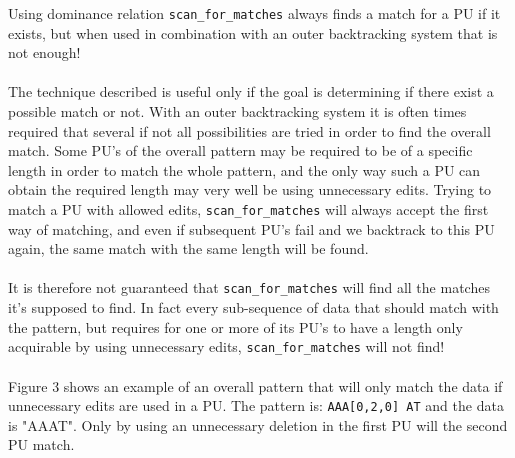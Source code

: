\documentclass[12pt]{article}
\newcommand{\scm}{\texttt{scan\_for\_matches} }
\newcommand{\pu}{PU }
\newcommand{\pus}{PU's }
\newcommand{\pup}{PU. }
\begin{document}
%
\noindent Using dominance relation \scm always finds a match for a \pu if it exists, but when used in combination
with an outer backtracking system that is not enough! \\ \\
The technique described is useful only if the goal is determining if there exist a possible match or not.
With an outer backtracking system it is often times required that several if not all possibilities are tried in
order to find the overall match. Some \pus of the overall pattern may be required to be of a specific length in order to
match the whole pattern, and the only way such a \pu can obtain the required length may very well be using unnecessary
edits. Trying to match a \pu with allowed edits, \scm will always accept the first way of matching, and even if
subsequent \pus fail and we backtrack to this \pu again, the same match with the same length will be found. \\ \\
It is therefore not guaranteed that \scm will find all the matches it's supposed to find. In fact every sub-sequence
of data that should match with the pattern, but requires for one or more of its \pus to have a length only
acquirable by using unnecessary edits, \scm will not find! \\ \\
Figure 3 shows an example of an overall pattern that will only match the data if unnecessary edits are used in a \pup
The pattern is: \texttt{AAA[0,2,0] AT} and the data is "AAAT". Only by using an unnecessary deletion in the first
\pu will the second \pu match.
\end{document}
